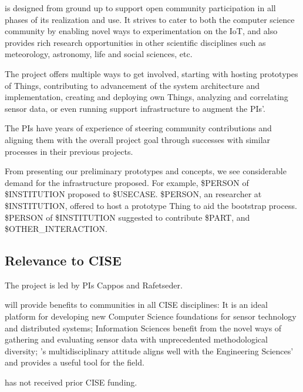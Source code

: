 \sysname is designed from ground up to support open community
participation in all phases of its realization and use.
It strives to cater to both the computer science community
by enabling novel ways to experimentation on the \acrlong{IoT},
and also provides rich research opportunities in other
scientific disciplines such as meteorology, astronomy, life and
social sciences, etc.

The project offers multiple ways to get involved, starting with
hosting prototypes of Things, contributing to advancement of the
system architecture and implementation, creating and deploying
own Things, analyzing and correlating sensor data, or even
running \sysname support infrastructure to augment the PIs'.

The PIs have years of experience of steering community contributions
and aligning them with the overall project goal through successes with
similar processes in their previous projects.

From presenting our preliminary prototypes and concepts,
we see considerable demand for the infrastructure proposed.
For example, \$PERSON of \$INSTITUTION proposed to \$USECASE.
\$PERSON, an researcher at \$INSTITUTION, offered to host
a prototype Thing to aid the bootstrap process.
\$PERSON of \$INSTITUTION suggested to contribute
\$PART, and \$OTHER\_INTERACTION.


\subsection{Relevance to CISE}

The project is led by PIs Cappos and Rafetseder.

\sysname will provide benefits to communities in all CISE disciplines:
It is an ideal platform for developing new Computer Science
foundations for sensor technology and distributed systems;
Information Sciences benefit from the novel ways of gathering
and evaluating sensor data with unprecedented methodological
diversity; %
\sysname's multidisciplinary attitude aligns well with the
Engineering Sciences' and provides a useful tool for the field.

\sysname has not received prior CISE funding.